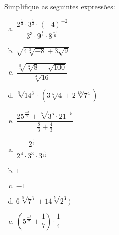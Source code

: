 \begin{secExercicios}
\begin{exer}
Simplifique as seguintes expressões:
\begin{enumerate}[a)]
\item $\dfrac{2^{\frac{1}{3}} \cdot 3^{\frac{1}{4}} \cdot (-4)^{-2}}{3^3 \cdot 9^{\frac{1}{3}} \cdot 8^{\frac{-1}{6}}}$
\item $\sqrt{4 \sqrt[3]{-8} + 3\sqrt{9}}$
\item $\dfrac{\sqrt[3]{\sqrt[3]{8} - \sqrt{100}}}{\sqrt[4]{16}}$
\item $\sqrt[5]{14^3} \cdot (3 \sqrt[5]{4} + 2 \sqrt[10]{7^4})$
\item $\dfrac{25^{\frac{-3}{4}} + \sqrt[5]{3^5 \cdot 21^{-5}}}{\frac{8}{3} + \frac{4}{3}}$
\end{enumerate}
\end{exer}
\begin{resp}
\begin{multicols}{2}
\begin{enumerate}[a)]
\item $\dfrac{2^{\frac{5}{6}}}{2^4 \cdot 3^3 \cdot 3^{\frac{5}{12}}}$
\item $1$
\item $-1$
\item $6\sqrt[5]{7^3} + 14 \sqrt[5]{2^3})$
\item $\left(5^{\frac{-3}{2}} + \dfrac{1}{7} \right) \cdot \dfrac{1}{4}$
\end{enumerate}
\end{multicols}
\end{resp}



\end{secExercicios}
